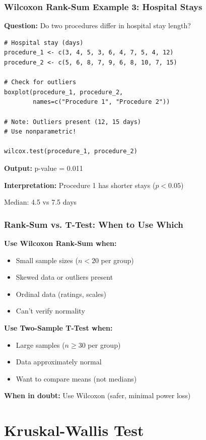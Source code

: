 \documentclass{beamer}
\begin{document}
\begin{frame}[fragile]
\frametitle{Wilcoxon Rank-Sum Example 3: Hospital Stays}
\textbf{Question:} Do two procedures differ in hospital stay length?

\vspace{0.3cm}
\begin{small}
\begin{verbatim}
# Hospital stay (days)
procedure_1 <- c(3, 4, 5, 3, 6, 4, 7, 5, 4, 12)
procedure_2 <- c(5, 6, 8, 7, 9, 6, 8, 10, 7, 15)

# Check for outliers
boxplot(procedure_1, procedure_2,
        names=c("Procedure 1", "Procedure 2"))

# Note: Outliers present (12, 15 days)
# Use nonparametric!

wilcox.test(procedure_1, procedure_2)
\end{verbatim}
\end{small}

\textbf{Output:} p-value = 0.011

\textbf{Interpretation:} Procedure 1 has shorter stays ($p < 0.05$)

Median: 4.5 vs 7.5 days
\end{frame}

\begin{frame}[fragile]
\frametitle{Rank-Sum vs. T-Test: When to Use Which}
\textbf{Use Wilcoxon Rank-Sum when:}
\begin{itemize}
\item Small sample sizes ($n < 20$ per group)
\item Skewed data or outliers present
\item Ordinal data (ratings, scales)
\item Can't verify normality
\end{itemize}

\vspace{0.5cm}
\textbf{Use Two-Sample T-Test when:}
\begin{itemize}
\item Large samples ($n \geq 30$ per group)
\item Data approximately normal
\item Want to compare means (not medians)
\end{itemize}

\vspace{0.5cm}
\textbf{When in doubt:} Use Wilcoxon (safer, minimal power loss)
\end{frame}

\section{Kruskal-Wallis Test}
\end{document}
